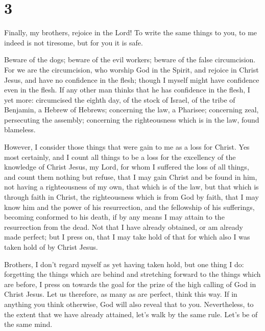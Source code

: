 \hypertarget{section-2}{%
\section{3}\label{section-2}}

 Finally, my brothers, rejoice in the Lord! To write the
same things to you, to me indeed is not tiresome, but for you it is
safe.

 Beware of the dogs; beware of the evil workers; beware of
the false circumcision.  For we are the circumcision, who
worship God in the Spirit, and rejoice in Christ Jesus, and have no
confidence in the flesh;  though I myself might have
confidence even in the flesh. If any other man thinks that he has
confidence in the flesh, I yet more:  circumcised the eighth
day, of the stock of Israel, of the tribe of Benjamin, a Hebrew of
Hebrews; concerning the law, a Pharisee;  concerning zeal,
persecuting the assembly; concerning the righteousness which is in the
law, found blameless.

 However, I consider those things that were gain to me as a
loss for Christ.  Yes most certainly, and I count all things
to be a loss for the excellency of the knowledge of Christ Jesus, my
Lord, for whom I suffered the loss of all things, and count them nothing
but refuse, that I may gain Christ  and be found in him, not
having a righteousness of my own, that which is of the law, but that
which is through faith in Christ, the righteousness which is from God by
faith,  that I may know him and the power of his
resurrection, and the fellowship of his sufferings, becoming conformed
to his death,  if by any means I may attain to the
resurrection from the dead.  Not that I have already
obtained, or am already made perfect; but I press on, that I may take
hold of that for which also I was taken hold of by Christ Jesus.

 Brothers, I don't regard myself as yet having taken hold,
but one thing I do: forgetting the things which are behind and
stretching forward to the things which are before,  I press
on towards the goal for the prize of the high calling of God in Christ
Jesus.  Let us therefore, as many as are perfect, think
this way. If in anything you think otherwise, God will also reveal that
to you.  Nevertheless, to the extent that we have already
attained, let's walk by the same rule. Let's be of the same mind.

